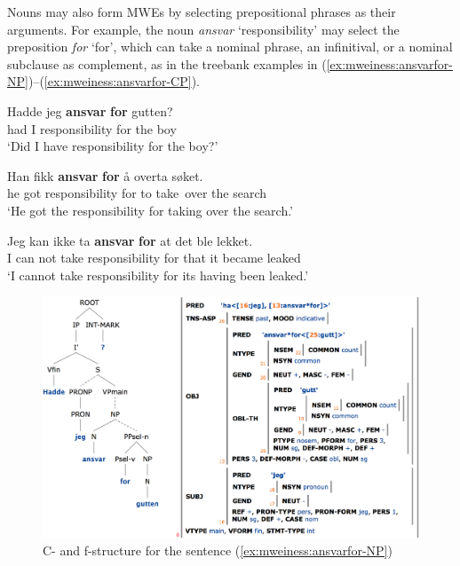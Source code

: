\documentclass[output=paper]{langsci/langscibook}
\begin{document}
Nouns may also form MWEs by selecting prepositional phrases as their arguments.
For example, the noun \textit{ansvar} `responsibility' may select the preposition \textit{for} `for', which can take a nominal phrase, an infinitival, or a nominal subclause as complement, as in the treebank examples in (\ref{ex:mweiness:ansvarfor-NP})–(\ref{ex:mweiness:ansvarfor-CP}).

\ea\label{ex:mweiness:ansvarfor-NP}
\gll Hadde jeg \textbf{ansvar} \textbf{for} gutten? \\
     had I responsibility for {the boy}\\
\glt `Did I have responsibility for the boy?'
\z


\ea\label{ex:mweiness:ansvarfor-inf}
\gll Han fikk \textbf{ansvar} \textbf{for} å overta søket. \\
     he got responsibility for to take over {the search}\\
\glt `He got the responsibility for taking over the search.'
\z


\ea\label{ex:mweiness:ansvarfor-CP}
\gll Jeg kan ikke ta \textbf{ansvar} \textbf{for} at det ble lekket. \\
    I can not take responsibility for that it became leaked\\
\glt `I cannot take responsibility for its having been leaked.'
\z

\begin{figure}
  \includegraphics[width=\textwidth]{figures/ansvarfor-NP-c-f.png}
  \caption{C- and f-structure for the sentence (\ref{ex:mweiness:ansvarfor-NP}) }
  \label{fig:mweiness:ansvarfor-NP-c-f}
\end{figure}
\end{document}
